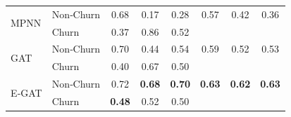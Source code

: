 \documentclass[journal]{IEEEtran}
\begin{document}
\begin{table}[htbp]
{\begin{tabular}{l l | c c c | c c c}
        \midrule
        \multirow{2}{*}{MPNN} 
            & Non‐Churn & 0.68 & 0.17 & 0.28 & 0.57 & 0.42 & 0.36 \\
            & Churn     & 0.37 & 0.86 & 0.52 &      &      &      \\

        \midrule
        \multirow{2}{*}{GAT} 
            & Non‐Churn     & 0.70 & 0.44 & 0.54 & 0.59 & 0.52 & 0.53 \\
            & Churn         & 0.40 & 0.67 & 0.50 &      &      &      \\
        \midrule
        \multirow{2}{*}{E‐GAT} 
            & Non‐Churn    & 0.72 & \textbf{0.68} & \textbf{0.70} & \textbf{0.63} & \textbf{0.62} & \textbf{0.63} \\
            & Churn         & \textbf{0.48} & 0.52 & 0.50 &      &      &      \\
        \bottomrule
    \end{tabular}}
\end{table}


\begin{table}[htbp]
    \centering
    \caption{Classification report of E-GAT models with execution times in Ecobici dataset.}
    \label{tab:classification_report_ecobici_egats}
\end{table}
\end{document}
